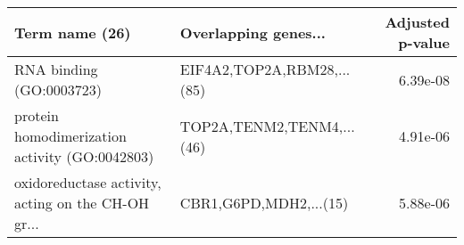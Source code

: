 \begin{tabular}{llr}
\toprule
                                    Term name (26) &       Overlapping genes... &  Adjusted p-value \\
\midrule
                          RNA binding (GO:0003723) & EIF4A2,TOP2A,RBM28,...(85) &          6.39e-08 \\
    protein homodimerization activity (GO:0042803) &  TOP2A,TENM2,TENM4,...(46) &          4.91e-06 \\
oxidoreductase activity, acting on the CH-OH gr... &     CBR1,G6PD,MDH2,...(15) &          5.88e-06 \\
\bottomrule
\end{tabular}
